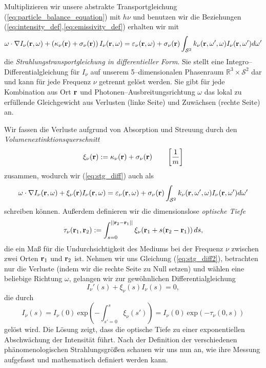 	Multiplizieren wir unsere abstrakte Transportgleichung (\ref{eq:particle_balance_equation}) mit $h\nu$ und benutzen wir die Beziehungen (\ref{eq:intensity_def},\ref{eq:emissivity_def}) erhalten wir mit
	\begin{equation}\label{eq:stg_diff}
	  \omega\cdot\nabla I_\nu(\mathbf{r},\omega)+\left(\kappa_\nu(\mathbf{r})+\sigma_\nu(\mathbf{r})\right)I_\nu(\mathbf{r},\omega)
	  =\varepsilon_\nu(\mathbf{r},\omega)+\sigma_\nu(\mathbf{r})\int_{\mathcal{S}^2}k_\nu(\mathbf{r},\omega',\omega)I_\nu(\mathbf{r},\omega')d\omega'
	\end{equation}
	die {\em Strahlungstransportgleichung in differentieller Form}. Sie stellt eine Integro--Differentialgleichung für $I_\nu$ auf unserem 5--dimensionalen Phasenraum $\mathbb{R}^3 \times \mathcal{S}^2$ dar und kann für jede Frequenz $\nu$ getrennt gelöst werden. Sie gibt für jede Kombination aus Ort $\mathbf{r}$ und Photonen--Ausbreitungsrichtung $\omega$ das lokal zu erfüllende Gleichgewicht aus Verlusten (linke Seite) und Zuwächsen (rechte Seite) an.
	
	Wir fassen die Verluste aufgrund von Absorption und Streuung durch den {\em Vo\-lu\-men\-ex\-tink\-ti\-ons\-quer\-schnitt}
	$$\xi_\nu(\mathbf{r}):=\kappa_\nu(\mathbf{r})+\sigma_\nu(\mathbf{r}) \qquad\left[\frac{1}{m}\right]$$
	zusammen, wodurch wir (\ref{eq:stg_diff}) auch als
	\begin{equation}\label{eq:stg_diff2}
	  \omega\cdot\nabla I_\nu(\mathbf{r},\omega)+\xi_\nu(\mathbf{r})I_\nu(\mathbf{r},\omega)
	  =\varepsilon_\nu(\mathbf{r},\omega)+\sigma_\nu(\mathbf{r})\int_{\mathcal{S}^2}k_\nu(\mathbf{r},\omega',\omega)I_\nu(\mathbf{r},\omega')d\omega'
	\end{equation}
	schreiben können.
	Außerdem definieren wir die dimensionslose {\em optische Tiefe}
	\begin{equation*}
		\tau_\nu(\mathbf{r}_1,\mathbf{r}_2):=\int_{s=0}^{||\mathbf{r}_2-\mathbf{r}_1||} \xi_\nu(\mathbf{r}_1+s(\mathbf{r}_2 - \mathbf{r}_1))\,ds,
	\end{equation*}
	die ein Maß für die Undurchsichtigkeit des Mediums bei der Frequenz $\nu$ zwischen zwei Orten $\mathbf{r}_1$ und $\mathbf{r}_2$ ist. Nehmen wir uns Gleichung (\ref{eq:stg_diff2}), betrachten nur die Verluste (indem wir die rechte Seite zu Null setzen) und wählen eine beliebige Richtung $\omega$, gelangen wir zur gewöhnlichen Differentialgleichung
	$$I_\nu'(s)+\xi_\nu(s)I_\nu(s)=0,$$
	die durch
	\begin{equation}
		I_\nu(s)=I_\nu(0)\:\text{exp}\left(-\int_{s'=0}^s \xi_\nu(s')\right)=I_\nu(0)\:\text{exp}\left(-\tau_\nu(0,s)\right)
		\label{eq:exponentialdecay}
	\end{equation}
	gelöst wird. Die Lösung zeigt, dass die optische Tiefe zu einer exponentiellen Abschwächung der Intensität führt. Nach der Definition der verschiedenen phänomenologischen Strahlungsgrößen schauen wir uns nun an, wie ihre Messung aufgefasst und mathematisch definiert werden kann.
	
